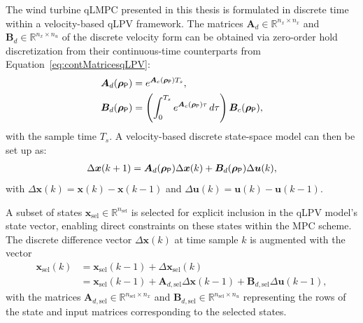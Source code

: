 The wind turbine qLMPC presented in this thesis is formulated in discrete time within a velocity-based qLPV framework. The matrices $\bm{A}_d\in \mathbb{R}^{n_x \times n_x}$ and $\bm{B}_d\in \mathbb{R}^{n_x \times n_u}$ of the discrete velocity form can be obtained via zero-order hold discretization from their continuous-time counterparts from Equation~\eqref{eq:contMatricesqLPV}:
\begin{equation} \label{eq:zoh1}
    \begin{aligned}
        \bm{A}_d(\bm{\rho}_{\mathsf{P}}) &= e^{\bm{A}_c(\bm{\rho}_{\mathsf{P}})T_s}, \\
        \bm{B}_d(\bm{\rho}_{\mathsf{P}}) &= \left( \int_0^{T_s} e^{\bm{A}_c(\bm{\rho}_{\mathsf{P}})\tau} \, d\tau \right) \bm{B}_c(\bm{\rho}_{\mathsf{P}}),
    \end{aligned}
\end{equation}
with the sample time $T_s$. A velocity-based discrete state-space model can then be set up as:
\begin{align} \label{eq:velocityFormDisc}
    \Delta\bm{x}(k+1) = \bm{A}_d(\bm{\rho}_{\mathsf{P}}) \Delta\bm{x}(k) + \bm{B}_d(\bm{\rho}_{\mathsf{P}}) \Delta\bm{u}(k),
\end{align}
with $\Delta\bm{x}(k) = \bm{x}(k) - \bm{x}(k-1)$ and $\Delta\bm{u}(k) = \bm{u}(k) - \bm{u}(k-1).$

A subset of states $\bm{x}_{\text{sel}} \in \mathbb{R}^{n_{\text{sel}}}$ is selected for explicit inclusion in the qLPV model's state vector, enabling direct constraints on these states within the MPC scheme. The discrete difference vector $\Delta\bm{x}(k)$ at time sample $k$ is augmented with the vector 
\begin{equation}  \label{eq:differenceSelectedFormDisc}
    \begin{aligned}
        \bm{x}_{\text{sel}}(k) &= \bm{x}_{\text{sel}}(k-1) + \Delta \bm{x}_{\text{sel}}(k) \\ 
        &=  \bm{x}_{\text{sel}}(k-1) +  \bm{A}_{d,\text{sel}}\Delta \bm{x}(k-1) +  \bm{B}_{d,\text{sel}}\Delta \bm{u}(k-1),   
    \end{aligned}
\end{equation}
with the matrices $\bm{A}_{d,\text{sel}} \in  \mathbb{R}^{n_{\text{sel}} \times n_x}$ and  $\bm{B}_{d,\text{sel}} \in  \mathbb{R}^{n_{\text{sel}} \times n_u}$ representing the rows of the state and input matrices corresponding to the selected states.

